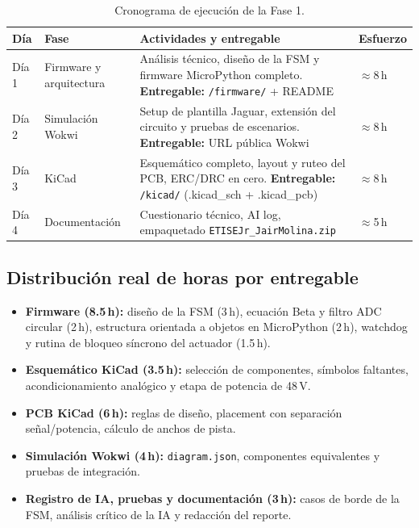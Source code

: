 \documentclass[11pt,letterpaper]{article}
\begin{document}
\begin{table}[H]
\centering\small
{}
\begin{tabularx}{\textwidth}{L{1.4cm} L{4.6cm} X L{1.6cm}}
\toprule
{}\color{white}\textbf{Día} & \color{white}\textbf{Fase} & \color{white}\textbf{Actividades y entregable} & \color{white}\textbf{Esfuerzo} \\
\midrule
Día 1 & Firmware y arquitectura & Análisis técnico, diseño de la FSM y firmware MicroPython completo. \textbf{Entregable:} \texttt{/firmware/} + README & $\approx$8\,h \\
Día 2 & Simulación Wokwi & Setup de plantilla Jaguar, extensión del circuito y pruebas de escenarios. \textbf{Entregable:} URL pública Wokwi & $\approx$8\,h \\
Día 3 & KiCad & Esquemático completo, layout y ruteo del PCB, ERC/DRC en cero. \textbf{Entregable:} \texttt{/kicad/} (.kicad\_sch + .kicad\_pcb) & $\approx$8\,h \\
Día 4 & Documentación & Cuestionario técnico, AI log, empaquetado \texttt{ETISEJr\_JairMolina.zip} & $\approx$5\,h \\
\bottomrule
\end{tabularx}
\caption{Cronograma de ejecución de la Fase 1.}
\end{table}

\subsection{Distribución real de horas por entregable}
\begin{itemize}
  \item \textbf{Firmware (8.5\,h):} diseño de la FSM (3\,h), ecuación Beta y filtro ADC circular (2\,h), estructura orientada a objetos en MicroPython (2\,h), watchdog y rutina de bloqueo síncrono del actuador (1.5\,h).
  \item \textbf{Esquemático KiCad (3.5\,h):} selección de componentes, símbolos faltantes, acondicionamiento analógico y etapa de potencia de 48\,V.
  \item \textbf{PCB KiCad (6\,h):} reglas de diseño, placement con separación señal/potencia, cálculo de anchos de pista.
  \item \textbf{Simulación Wokwi (4\,h):} \texttt{diagram.json}, componentes equivalentes y pruebas de integración.
  \item \textbf{Registro de IA, pruebas y documentación (3\,h):} casos de borde de la FSM, análisis crítico de la IA y redacción del reporte.
\end{itemize}
\end{document}
